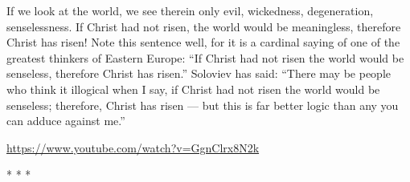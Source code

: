 \begin{quotationx}
If we look at the world, we see therein only evil, wickedness, degeneration, senselessness. If Christ had not risen, the world would be meaningless, therefore Christ has risen! Note this sentence well, for it is a cardinal saying of one of the greatest thinkers of Eastern Europe: ``If Christ had not risen the world would be senseless, therefore Christ has risen.'' Soloviev has said: ``There may be people who think it illogical when I say, if Christ had not risen the world would be senseless; therefore, Christ has risen --- but this is far better logic than any you can adduce against me.''
\end{quotationx}

\url{https://www.youtube.com/watch?v=GgnClrx8N2k} 


\begin{center}* * *\end{center}

